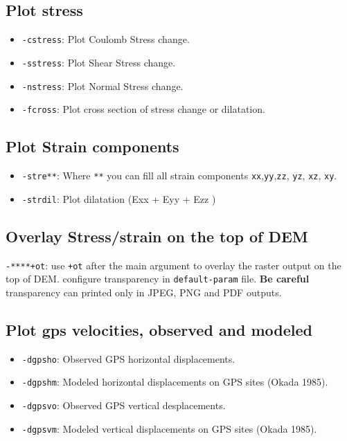 \subsection{Plot stress}\label{plot-stress}

\begin{itemize}
\item
  \texttt{-cstress}: Plot Coulomb Stress change.
\item
  \texttt{-sstress}: Plot Shear Stress change.
\item
  \texttt{-nstress}: Plot Normal Stress change.
\item
  \texttt{-fcross}: Plot cross section of stress change or dilatation.
\end{itemize}

\subsection{Plot Strain components}\label{plot-strain-components}

\begin{itemize}
\item
  \texttt{-stre**}: Where \texttt{**} you can fill all strain components
  \texttt{xx},\texttt{yy},\texttt{zz}, \texttt{yz}, \texttt{xz},
  \texttt{xy}.
\item
  \texttt{-strdil}: Plot dilatation (Exx + Eyy + Ezz )
\end{itemize}

\subsection{Overlay Stress/strain on the top of DEM}

\texttt{-****+ot}: use \texttt{+ot} after the main argument to overlay
the raster output on the top of DEM. configure transparency in
\texttt{default-param} file. \textbf{Be careful} transparency can
printed only in JPEG, PNG and PDF outputs.

\subsection{Plot gps velocities, observed and
modeled}\label{plot-gps-velocities-observed-and-modeled}

\begin{itemize}
\item
  \texttt{-dgpsho}: Observed GPS horizontal displacements.
\item
  \texttt{-dgpshm}: Modeled horizontal displacements on GPS sites (Okada
  1985).
\item
  \texttt{-dgpsvo}: Observed GPS vertical desplacements.
\item
  \texttt{-dgpsvm}: Modeled vertical displacements on GPS sites (Okada
  1985).
\end{itemize}

